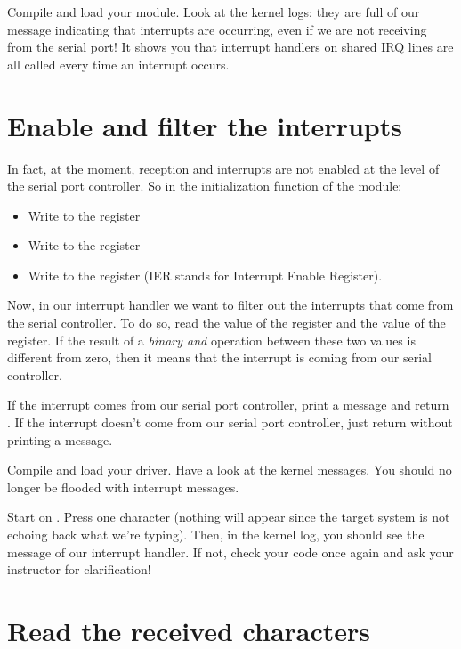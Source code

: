 Compile and load your module. Look at the kernel logs: they are full
of our message indicating that interrupts are occurring, even if we
are not receiving from the serial port! It shows you that interrupt
handlers on shared IRQ lines are all called every time an interrupt
occurs.

\section{Enable and filter the interrupts}

In fact, at the moment, reception and interrupts are not enabled at
the level of the serial port controller. So in the initialization
function of the module:
\begin{itemize}
\item Write  to the
   register
\item Write  to the
   register
\item Write  to the 
  register (IER stands for Interrupt Enable Register).
\end{itemize}

Now, in our interrupt handler we want to filter out the interrupts
that come from the serial controller. To do so, read the value of the
 register and the value of the
 register. If the result of a {\em binary and}
operation between these two values is different from zero, then it
means that the interrupt is coming from our serial controller.

If the interrupt comes from our serial port controller, print a
message and return . If the interrupt doesn't come from
our serial port controller, just return  without printing a
message.

Compile and load your driver. Have a look at the kernel messages. You
should no longer be flooded with interrupt messages.

Start  on . Press one character (nothing will
appear since the target system is not echoing back what we're
typing). Then, in the kernel log, you should see the message of our
interrupt handler. If not, check your code once again and ask your
instructor for clarification!

\section{Read the received characters}

